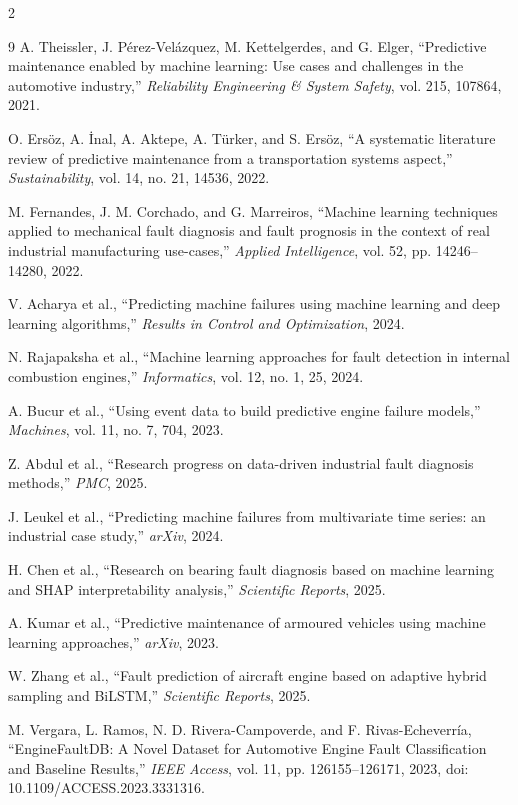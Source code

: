 \documentclass[10pt, letterpaper]{article}
\begin{document}
\begin{multicols}{2}
\begin{thebibliography}{9}
A. Theissler, J. Pérez-Velázquez, M. Kettelgerdes, and G. Elger,
``Predictive maintenance enabled by machine learning: Use cases and challenges in the automotive industry,''
\textit{Reliability Engineering \& System Safety}, vol. 215, 107864, 2021.

O. Ersöz, A. İnal, A. Aktepe, A. Türker, and S. Ersöz,
``A systematic literature review of predictive maintenance from a transportation systems aspect,''
\textit{Sustainability}, vol. 14, no. 21, 14536, 2022.

M. Fernandes, J. M. Corchado, and G. Marreiros,
``Machine learning techniques applied to mechanical fault diagnosis and fault prognosis in the context of real industrial manufacturing use-cases,''
\textit{Applied Intelligence}, vol. 52, pp. 14246--14280, 2022.

V. Acharya et al.,
``Predicting machine failures using machine learning and deep learning algorithms,''
\textit{Results in Control and Optimization}, 2024.

N. Rajapaksha et al.,
``Machine learning approaches for fault detection in internal combustion engines,''
\textit{Informatics}, vol. 12, no. 1, 25, 2024.

A. Bucur et al.,
``Using event data to build predictive engine failure models,''
\textit{Machines}, vol. 11, no. 7, 704, 2023.

Z. Abdul et al.,
``Research progress on data-driven industrial fault diagnosis methods,''
\textit{PMC}, 2025.

J. Leukel et al.,
``Predicting machine failures from multivariate time series: an industrial case study,''
\textit{arXiv}, 2024.

H. Chen et al.,
``Research on bearing fault diagnosis based on machine learning and SHAP interpretability analysis,''
\textit{Scientific Reports}, 2025.

A. Kumar et al.,
``Predictive maintenance of armoured vehicles using machine learning approaches,''
\textit{arXiv}, 2023.

W. Zhang et al.,
``Fault prediction of aircraft engine based on adaptive hybrid sampling and BiLSTM,''
\textit{Scientific Reports}, 2025.

M. Vergara, L. Ramos, N. D. Rivera-Campoverde, and F. Rivas-Echeverría,
``EngineFaultDB: A Novel Dataset for Automotive Engine Fault Classification and Baseline Results,''
\textit{IEEE Access}, vol. 11, pp. 126155--126171, 2023,
doi: 10.1109/ACCESS.2023.3331316.

\end{thebibliography}

\end{multicols}
\end{document}
